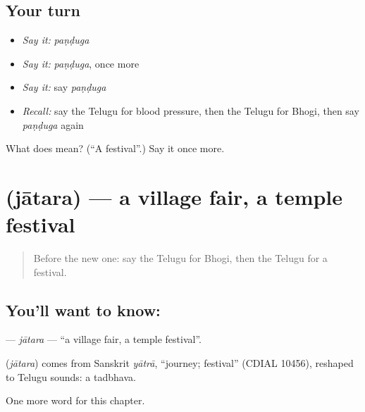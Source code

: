 \subsection*{Your turn}
\begin{itemize}
\raggedright
  \item \emph{Say it:} \emph{paṇḍuga}
  \item \emph{Say it:} \emph{paṇḍuga}, once more
  \item \emph{Say it:} say \emph{paṇḍuga}
  \item \emph{Recall:} say the Telugu for blood pressure, then the Telugu for Bhogi, then say \emph{paṇḍuga} again
\end{itemize}

\begin{tcolorbox}[breakable,colback=teal!4,colframe=teal!35!black,title={Before you move on}]
What does  mean? (\textquotedblleft{}A festival\textquotedblright{}.) Say it once more.
\end{tcolorbox}
\section[\texorpdfstring{\te{జాతర} (jātara)}{జాతర (jātara)}]{ (jātara) — a village fair, a temple festival}

\label{lesson:TE-C289-jatara}



\begin{quote}
Before the new one: say the Telugu for Bhogi, then the Telugu for a festival.
\end{quote}

\subsection*{You'll want to know: }
\textbf{} — \emph{jātara} — \textquotedblleft{}a village fair, a temple festival\textquotedblright{}.

\begin{cousinweb}
\textbf{} (\emph{jātara}) comes from Sanskrit \emph{yātrā}, \textquotedblleft{}journey; festival\textquotedblright{} (CDIAL 10456), reshaped to Telugu sounds: a tadbhava.
\end{cousinweb}

\begin{grammarlens}[title={What you've built}]
One more word for this chapter.
\end{grammarlens}

